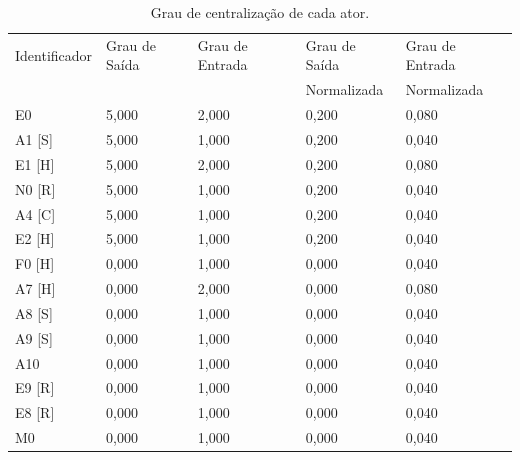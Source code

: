 \begin{table}[htbp]
\centering
\caption{Grau de centralização de cada ator.}
\label{table-centralize-degree}
\begin{tabular}{|l|l|l|l|l|}
\hline
Identificador & Grau de Saída & Grau de Entrada & Grau de Saída  & Grau de Entrada \\ 
	      &               &                 & Normalizada    & Normalizada \\ \hline
E0            & 5,000         & 2,000           & 0,200                     & 0,080                       \\ \hline
A1 {[}S{]}    & 5,000         & 1,000           & 0,200                     & 0,040                       \\ \hline
E1 {[}H{]}    & 5,000         & 2,000           & 0,200                     & 0,080                       \\ \hline
N0 {[}R{]}    & 5,000         & 1,000           & 0,200                     & 0,040                       \\ \hline
A4 {[}C{]}    & 5,000         & 1,000           & 0,200                     & 0,040                       \\ \hline
E2 {[}H{]}    & 5,000         & 1,000           & 0,200                     & 0,040                       \\ \hline
F0 {[}H{]}    & 0,000         & 1,000           & 0,000                     & 0,040                       \\ \hline
A7 {[}H{]}    & 0,000         & 2,000           & 0,000                     & 0,080                       \\ \hline
A8 {[}S{]}    & 0,000         & 1,000           & 0,000                     & 0,040                       \\ \hline
A9 {[}S{]}    & 0,000         & 1,000           & 0,000                     & 0,040                       \\ \hline
A10           & 0,000         & 1,000           & 0,000                     & 0,040                       \\ \hline
E9 {[}R{]}    & 0,000         & 1,000           & 0,000                     & 0,040                       \\ \hline
E8 {[}R{]}    & 0,000         & 1,000           & 0,000                     & 0,040                       \\ \hline
M0            & 0,000         & 1,000           & 0,000                     & 0,040                       \\ \hline

\end{tabular}
\end{table}

